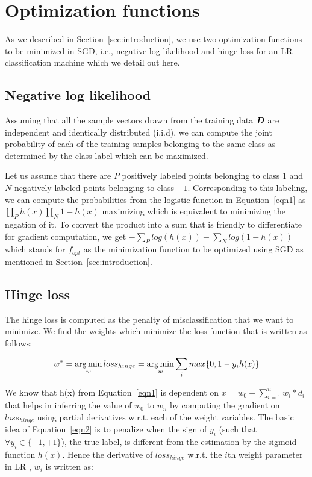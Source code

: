 \section{Optimization functions\label{sec:optfunc}}
As we described in Section~\ref{sec:introduction}, we use two optimization functions to be minimized in SGD, i.e., negative log likelihood and hinge loss for an LR classification machine which we detail out here. 

\subsection{Negative log likelihood\label{sec:loglh}}
Assuming that all the sample vectors drawn from the training data $\boldsymbol{D}$ are independent and identically distributed (i.i.d), we can compute the joint probability of each of the training samples belonging to the same class as determined by the class label which can be maximized.

Let us assume that there are $P$ positively labeled points belonging to class $1$ and $N$ negatively labeled points belonging to class $-1$. Corresponding to this labeling, we can compute the probabilities from the logistic function in Equation~\ref{eqn1} as $\prod_{P} h(x) \prod_{N} 1-h(x)$ maximizing which is equivalent to minimizing the negation of it. To convert the product into a sum that is friendly to differentiate for gradient computation, we get $-\sum_{P} log(h(x)) - \sum_{N} log(1-h(x))$ which stands for $f_{opt}$ as the minimization function to be optimized using SGD as mentioned in Section~\ref{sec:introduction}.

\subsection{Hinge loss\label{sec:hinge}}
The hinge loss is computed as the penalty of misclassification that we want to minimize.  We find the weights which minimize the loss function that is written as follows:

\begin{equation}
w^* = \argmin_{w} {loss_{hinge}}\\ = \argmin_{w}{\sum_{i}max\{0,1-y_ih(x)\}}
\label{eqn2}
\end{equation}

We know that h(x) from Equation~\ref{eqn1} is dependent on $ x  = w_0 + \sum_{i=1}^{n} {w_i * d_i}$ that helps in inferring the value of $w_0$ to $w_n$ by computing the gradient on $loss_{hinge}$ using partial derivatives w.r.t. each of the weight variables. The basic idea of Equation~\ref{eqn2} is to penalize when the sign of $y_i$  (such that $\forall y_i \in \{-1,+1\}$), the true label, is different from the estimation by the sigmoid function $h(x)$. Hence the derivative of $loss_{hinge}$ w.r.t. the $i$th weight parameter in LR , $w_i$ is written as:

